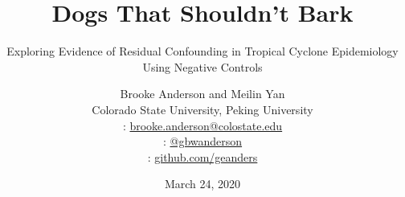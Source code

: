\usepackage{booktabs}
\usepackage{array}
\usepackage{colortbl}
\usepackage[british]{babel}
\usepackage{graphicx,hyperref,url}
\usepackage{fontawesome}
\usepackage{hyperref}
\usepackage{adjustbox}
\usepackage{appendixnumberbeamer}
\hypersetup{colorlinks=true,allcolors=blue}

\title{Dogs That Shouldn't Bark}
\subtitle{Exploring Evidence of Residual Confounding in Tropical Cyclone Epidemiology Using Negative Controls}
\date{March 24, 2020}

\author[Anderson]{
  Brooke Anderson and Meilin Yan \\ 
  Colorado State University, Peking University \medskip \\ 
  {\small \faEnvelope: \url{brooke.anderson@colostate.edu}} \\
  {\small \faTwitter: \href{www.twitter.com/gbwanderson}{@gbwanderson}} \\
  {\small \faGithub:  \url{github.com/geanders}}
  }



